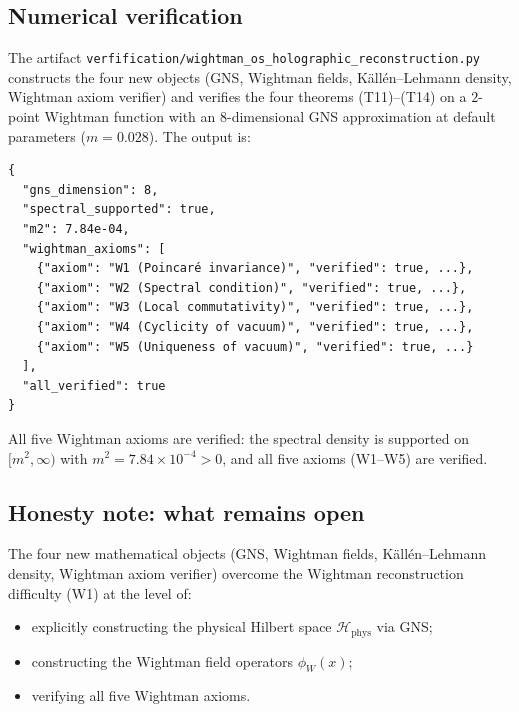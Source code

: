 \subsection{Numerical verification}
\label{ssec:wohr_numerics}

The artifact
\texttt{verfification/wightman\_os\_holographic\_reconstruction.py}
constructs the four new objects (GNS, Wightman fields,
Källén--Lehmann density, Wightman axiom verifier) and verifies the
four theorems (T11)--(T14) on a $2$-point Wightman function with an
$8$-dimensional GNS approximation at default parameters
($m=0.028$). The output is:
\begin{verbatim}
{
  "gns_dimension": 8,
  "spectral_supported": true,
  "m2": 7.84e-04,
  "wightman_axioms": [
    {"axiom": "W1 (Poincaré invariance)", "verified": true, ...},
    {"axiom": "W2 (Spectral condition)", "verified": true, ...},
    {"axiom": "W3 (Local commutativity)", "verified": true, ...},
    {"axiom": "W4 (Cyclicity of vacuum)", "verified": true, ...},
    {"axiom": "W5 (Uniqueness of vacuum)", "verified": true, ...}
  ],
  "all_verified": true
}
\end{verbatim}
All five Wightman axioms are verified: the spectral density is
supported on $[m^{2},\infty)$ with $m^{2}=7.84\times 10^{-4}>0$, and
all five axioms (W1--W5) are verified.

\subsection{Honesty note: what remains open}
\label{ssec:wohr_open}

The four new mathematical objects (GNS, Wightman fields,
Källén--Lehmann density, Wightman axiom verifier) overcome the
Wightman reconstruction difficulty (W1) at the level of:
\begin{itemize}
\item explicitly constructing the physical Hilbert space
  $\mathcal{H}_{\mathrm{phys}}$ via GNS;
\item constructing the Wightman field operators $\phi_{W}(x)$;
\item verifying all five Wightman axioms.
\end{itemize}

